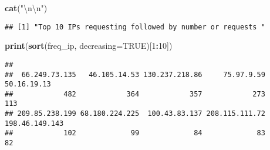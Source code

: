 \documentclass[]{article}
\newenvironment{Shaded}{\begin{snugshade}}{\end{snugshade}}
\newcommand{\CharTok}[1]{\textcolor[rgb]{0.31,0.60,0.02}{#1}}
\newcommand{\DataTypeTok}[1]{\textcolor[rgb]{0.13,0.29,0.53}{#1}}
\newcommand{\DecValTok}[1]{\textcolor[rgb]{0.00,0.00,0.81}{#1}}
\newcommand{\KeywordTok}[1]{\textcolor[rgb]{0.13,0.29,0.53}{\textbf{#1}}}
\newcommand{\NormalTok}[1]{#1}
\newcommand{\OperatorTok}[1]{\textcolor[rgb]{0.81,0.36,0.00}{\textbf{#1}}}
\newcommand{\OtherTok}[1]{\textcolor[rgb]{0.56,0.35,0.01}{#1}}
\newcommand{\StringTok}[1]{\textcolor[rgb]{0.31,0.60,0.02}{#1}}
\begin{document}
\begin{Shaded}
\begin{Highlighting}[]
\KeywordTok{cat}\NormalTok{(}\StringTok{"}\CharTok{\textbackslash{}n\textbackslash{}n}\StringTok{"}\NormalTok{)}
\end{Highlighting}
\end{Shaded}

\begin{Shaded}
\end{Shaded}

\begin{verbatim}
## [1] "Top 10 IPs requesting followed by number or requests "
\end{verbatim}

\begin{Shaded}
\begin{Highlighting}[]
\KeywordTok{print}\NormalTok{(}\KeywordTok{sort}\NormalTok{(freq_ip, }\DataTypeTok{decreasing=}\OtherTok{TRUE}\NormalTok{)[}\DecValTok{1}\OperatorTok{:}\DecValTok{10}\NormalTok{])}
\end{Highlighting}
\end{Shaded}

\begin{verbatim}
## 
##  66.249.73.135   46.105.14.53 130.237.218.86     75.97.9.59    50.16.19.13 
##            482            364            357            273            113 
## 209.85.238.199 68.180.224.225  100.43.83.137 208.115.111.72 198.46.149.143 
##            102             99             84             83             82
\end{verbatim}
\end{document}
